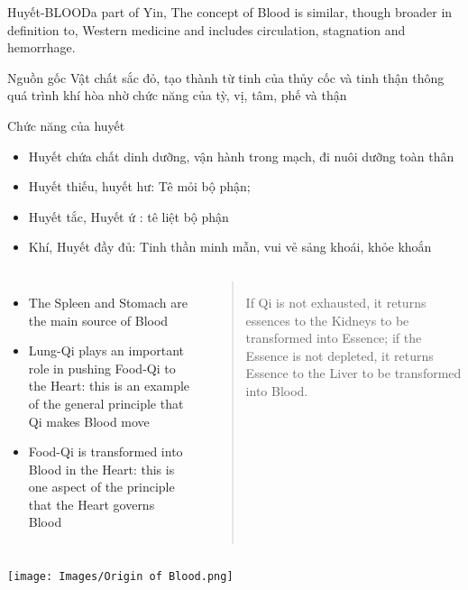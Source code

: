 \documentclass[
	11pt, %
]{beamer}
\theoremstyle{newblock}
\begin{document}
\begin{frame}{Huyết-BLOOD}{a part of Yin, The concept of Blood is similar, though broader in definition to, Western medicine and includes circulation, stagnation and hemorrhage.}
	\begin{block}{Nguồn gốc}
		Vật chất sắc đỏ, tạo thành từ tinh của thủy cốc và tinh thận thông quá trình khí hòa nhờ chức năng của tỳ, vị, tâm, phế và thận
	\end{block}
	\begin{block}{Chức năng của huyết}
		\begin{itemize}
			\item Huyết chứa chất dinh dưỡng, vận hành trong mạch, đi nuôi dưỡng toàn thân
			\item Huyết thiếu, huyết hư: Tê mỏi bộ phận; 
			\item Huyết tắc, Huyết ứ : tê liệt bộ phận
			\item Khí, Huyết đầy đủ: Tinh thần minh mẫn, vui vẻ sảng khoái, khỏe khoắn
		\end{itemize}
	\end{block}

\end{frame}
\begin{frame}
	\begin{columns}
		\small{
		\begin{itemize}
			\item The Spleen and Stomach are the main source of Blood
			\item Lung-Qi plays an important role in pushing Food-Qi to the 
			Heart: this is an example of the general principle that Qi 
			makes Blood move
			\item Food-Qi is transformed into Blood in the Heart: this is one 
			aspect of the principle that the Heart governs Blood
		\end{itemize}
		}
		\small{
			\begin{quote}
				If Qi is not exhausted, it returns essences to the Kidneys to be transformed into Essence; if the Essence is not depleted, it returns Essence to the Liver to be transformed into Blood.
			\end{quote}

		}
	\end{columns}
	\begin{center}
		\texttt{[image: Images/Origin of Blood.png]}
	\end{center}
\end{frame}
\end{document}
